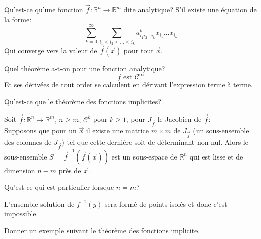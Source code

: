 \documentclass{amsart}
\begin{document}
\vspace{10pt}
Qu'est-ce qu'une fonction $\vec f \colon \mathbb R^n\to \mathbb R^m$ dite analytique?
S'il existe une \'equation de la forme:
\[ \sum_{k=0}^\infty \sum_{i_1\leq i_2\leq \dots \leq i_k} a_{i_1i_2\dots i_k}^k x_{i_1}\dots x_{i_k} \]
Qui converge vers la valeur de $\vec f(\vec x)$ pour tout $\vec x$.

\vspace{10pt}
Quel th\'eor\`eme a-t-on pour une fonction analytique?
\[ f \text{ est } \mathcal C^\infty \]
Et ses d\'eriv\'ees de tout order se calculent en d\'erivant l'expression terme \`a terme.

\vspace{10pt}
Qu'est-ce que le th\'eor\`eme des fonctions implicites?

Soit $\vec f\colon \mathbb R^n \to \mathbb R^m,\, n \geq m,\, \mathcal C^k$ pour $k \geq 1$, pour $J_{\vec f}$ le Jacobien de $\vec f$:\\
Supposons que pour un $\vec x$ il existe une matrice $m\times m$ de $J_{\vec f}$ (un sous-ensemble des colonnes de $J_{\vec f}$) tel que cette derni\`ere soit de 
d\'eterminant non-nul. Alors le sous-ensemble $S = \vec f^{-1}(\vec f(\vec x))$ est un sous-espace de $\mathbb R^n$ qui est lisse et de dimension $n-m$ pr\`es de $\vec x$.

\vspace{10pt}
Qu'est-ce qui est particulier lorsque $n=m$?

L'ensemble solution de $f^{-1}(y)$ sera form\'e de points isol\'es et donc c'est impossible.

\vspace{10pt}
Donner un exemple suivant le th\'eor\`eme des fonctions implicite.
\end{document}
